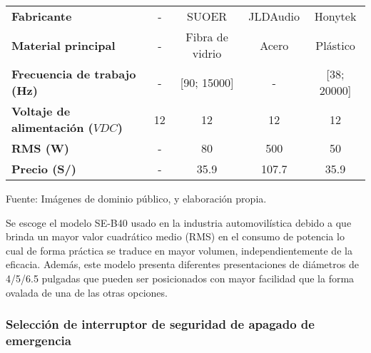 \begin{itemize}
\begin{mytable}[H]
\begin{tabular}{l|c|c|c|c|}
\begin{minipage}{\mythirdmaxsizeofcontenttable}
			\end{minipage}  \\ \hline
			\multicolumn{1}{|l|}{\textbf{Fabricante}} & - & SUOER & JLDAudio & 
			Honytek \\ \hline
			\multicolumn{1}{|l|}{\textbf{Material principal}} & - & Fibra de vidrio & Acero & Plástico \\ \hline
			\multicolumn{1}{|l|}{				
				\begin{minipage}{\myforthmaxsizeofcontenttable}	
					\textbf{Frecuencia de trabajo (Hz)}
				\end{minipage}
			}& - & [90; 15000] & - & [38; 20000]  \\ \hline
			\multicolumn{1}{|l|}{
				\begin{minipage}{\myforthmaxsizeofcontenttable}	
					\textbf{Voltaje de alimentación ($VDC$)}
				\end{minipage}
			} & 12 & 12 & 12 & 12 \\ \hline
			\multicolumn{1}{|l|}{\textbf{RMS (W)}} & -  & 80 & 500 & 50 \\ \hline
			\multicolumn{1}{|l|}{\textbf{Precio (S/)}} & - & 35.9 & 107.7 & 35.9 \\ \hline
		\end{tabular}
		\begin{myflushcenteraftertable}	
			Fuente: Imágenes de dominio público, %
			y elaboración propia.
		\end{myflushcenteraftertable}
	\end{mytable}
	
	Se escoge el modelo SE-B40 usado en la industria automovilística debido a que brinda un mayor valor cuadrático medio (RMS) en el consumo de potencia lo cual de forma práctica se traduce en mayor volumen, independientemente de la eficacia. Además, este modelo presenta diferentes presentaciones de diámetros de 4/5/6.5 pulgadas que pueden ser posicionados con mayor facilidad que la forma ovalada de una de las otras opciones.
	
\end{itemize}

\subsubsection{Selección de interruptor de seguridad de apagado de emergencia}

